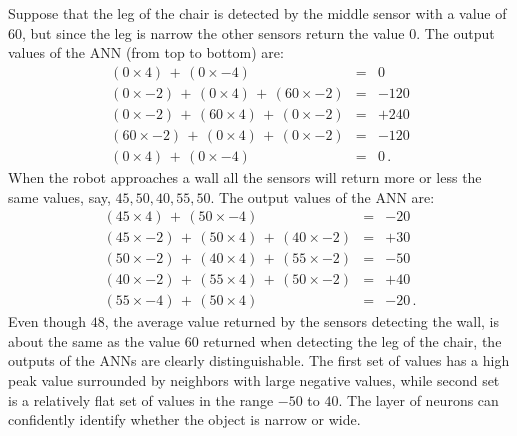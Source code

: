 Suppose that the leg of the chair is detected by the middle sensor with a value of $60$, but since the leg is narrow the other sensors return the value $0$. The output values of the ANN (from top to bottom) are:
\begin{eqnarray*}
(0\times 4) \,+ \, (0\times -4) &=& 0\\
(0\times -2) \,+ \, (0\times 4) \,+ \, (60\times -2)&=&-120\\
(0\times -2) \,+ \, (60\times 4) \,+ \,  (0\times -2)&=&+240\\
(60\times -2) \,+ \, (0\times 4) \,+ \, (0\times -2)&=&-120\\
(0\times 4) \,+ \, (0\times -4) &=&0\,.
\end{eqnarray*}
When the robot approaches a wall all the sensors will return more or less the same values, say, $45, 50, 40, 55, 50$. The output values of the ANN are:
\begin{eqnarray*}
(45\times 4)  \,+ \, (50\times -4)&=&-20\\
(45\times -2) \,+ \, (50\times 4) \,+ \, (40\times -2)&=&+30\\
(50\times -2) \,+ \, (40\times 4) \,+ \, (55\times -2)&=&-50\\
(40\times -2) \,+ \, (55\times 4) \,+ \, (50\times -2)&=&+40\\
(55\times -4) \,+ \, (50\times 4)&=&-20\,.
\end{eqnarray*}
Even though $48$, the average value returned by the sensors detecting the wall, is about the same as the value $60$ returned when detecting the leg of the chair, the outputs of the ANNs are clearly distinguishable. The first set of values has a high peak value surrounded by neighbors with large negative values, while second set is a relatively flat set of values in the range $-50$ to $40$. The layer of neurons can confidently identify whether the object is narrow or wide.

